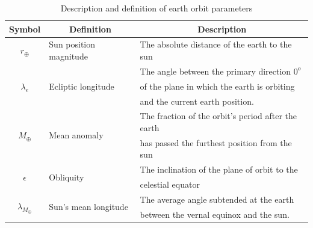 \begin{table}[]
	\label{table:SunOrbitParameters}
\begin{tabular}{@{}cll@{}}
	\toprule
	\multicolumn{1}{c}{\textbf{Symbol}} &
	\multicolumn{1}{c}{\textbf{Definition}} &
	\multicolumn{1}{c}{\textbf{Description}} \\ \midrule
	\multicolumn{1}{|c|}{$r_{\oplus}$} &
	\multicolumn{1}{l|}{Sun position magnitude} &
	\multicolumn{1}{l|}{The absolute distance of the earth to the sun} \\ \midrule
	\multicolumn{1}{|c|}{\multirow{3}{*}{$\lambda_e$}} &
	\multicolumn{1}{l|}{\multirow{3}{*}{Ecliptic longitude}} &
	\multicolumn{1}{l|}{The angle between the primary direction $0^o$} \\
	\multicolumn{1}{|c|}{} &
	\multicolumn{1}{l|}{} &
	\multicolumn{1}{l|}{of the plane in which the earth is orbiting} \\
	\multicolumn{1}{|c|}{} &
	\multicolumn{1}{l|}{} &
	\multicolumn{1}{l|}{and the current earth position.} \\ \midrule
	\multicolumn{1}{|c|}{\multirow{2}{*}{$M_{\oplus}$}} &
	\multicolumn{1}{l|}{\multirow{2}{*}{Mean anomaly}} &
	\multicolumn{1}{l|}{The fraction of the orbit's period after the earth} \\
	\multicolumn{1}{|c|}{} &
	\multicolumn{1}{l|}{} &
	\multicolumn{1}{l|}{has passed the furthest position from the sun} \\ \midrule
	\multicolumn{1}{|c|}{\multirow{2}{*}{$\epsilon$}} &
	\multicolumn{1}{l|}{\multirow{2}{*}{Obliquity}} &
	\multicolumn{1}{l|}{The inclination of the plane of orbit to the} \\
	\multicolumn{1}{|c|}{} &
	\multicolumn{1}{l|}{} &
	\multicolumn{1}{l|}{celestial equator} \\ \midrule
	\multicolumn{1}{|c|}{\multirow{2}{*}{$\lambda_{M_{\oplus}}$}} &
	\multicolumn{1}{l|}{\multirow{2}{*}{Sun's mean longitude}} &
	\multicolumn{1}{l|}{The average angle subtended at the earth} \\
	\multicolumn{1}{|c|}{} &
	\multicolumn{1}{l|}{} &
	\multicolumn{1}{l|}{between the vernal equinox and the sun. \cite{thevernaross1916sun}} \\ \bottomrule
\end{tabular}
\caption{Description and definition of earth orbit parameters}
\end{table}

